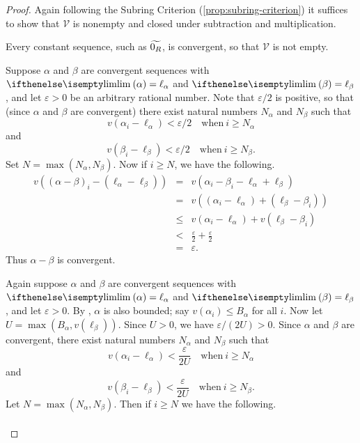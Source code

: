 \begin{proof}
Again following the Subring Criterion (\ref{prop:subring-criterion}) it suffices to show that \(\mathcal{V}\) is nonempty and closed under subtraction and multiplication.
\begin{inlineproplist}
\item Every constant sequence, such as \(\widetilde{0_R}\), is convergent, so that \(\mathcal{V}\) is not empty.
\item Suppose \(\alpha\) and \(\beta\) are convergent sequences with \(\LIM{\alpha} = \ell_\alpha\) and \(\LIM{\beta} = \ell_\beta\), and let \(\varepsilon > 0\) be an arbitrary rational number.
Note that \(\varepsilon/2\) is positive, so that (since \(\alpha\) and \(\beta\) are convergent) there exist natural numbers \(N_\alpha\) and \(N_\beta\) such that \[ v(\alpha_i - \ell_\alpha) < \varepsilon/2 \quad \mathrm{when}\ i \geq N_\alpha \] and \[ v(\beta_i - \ell_\beta) < \varepsilon/2 \quad \mathrm{when}\ i \geq N_\beta. \]
Set \(N = \max(N_\alpha, N_\beta)\).
Now if \(i \geq N\), we have the following.
\begin{eqnarray*}
v\left((\alpha - \beta)_i - (\ell_\alpha - \ell_\beta)\right)
 & = & v(\alpha_i - \beta_i - \ell_\alpha + \ell_\beta) \\
 & = & v\left((\alpha_i - \ell_\alpha) + (\ell_\beta - \beta_i)\right) \\
 & \leq & v(\alpha_i - \ell_\alpha) + v(\ell_\beta - \beta_i) \\
 & < & \frac{\varepsilon}{2} + \frac{\varepsilon}{2} \\
 & = & \varepsilon.
\end{eqnarray*}
Thus \(\alpha - \beta\) is convergent.
\item Again suppose \(\alpha\) and \(\beta\) are convergent sequences with \(\LIM{\alpha} = \ell_\alpha\) and \(\LIM{\beta} = \ell_\beta\), and let \(\varepsilon > 0\).
By , \(\alpha\) is also bounded; say \(v(\alpha_i) \leq B_\alpha\) for all \(i\).
Now let \(U = \max\left(B_\alpha, v(\ell_\beta)\right)\).
Since \(U > 0\), we have \(\varepsilon/(2U) > 0\).
Since \(\alpha\) and \(\beta\) are convergent, there exist natural numbers \(N_\alpha\) and \(N_\beta\) such that \[ v(\alpha_i - \ell_\alpha) < \frac{\varepsilon}{2U} \quad \mathrm{when}\ i \geq N_\alpha \] and \[ v(\beta_i - \ell_\beta) < \frac{\varepsilon}{2U} \quad \mathrm{when}\ i \geq N_\beta. \]
Let \(N = \max(N_\alpha, N_\beta)\).
Then if \(i \geq N\) we have the following.
\begin{eqnarray*}

\end{eqnarray*}
\end{inlineproplist}
\end{proof}
